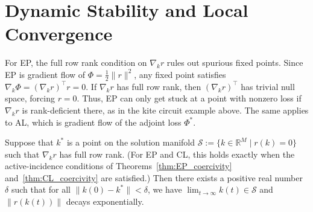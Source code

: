 \documentclass{siamart}
\begin{document}
\section{Dynamic Stability and Local Convergence}
\label{sec:convergence}

\begin{remark}
For EP, the full row rank condition on $\nabla_k r$ rules out spurious fixed points. Since EP is gradient flow of $\Phi = \frac{1}{2}\|r\|^2$, any fixed point satisfies $\nabla_k \Phi = (\nabla_k r)^\top r = 0$. If $\nabla_k r$ has full row rank, then $(\nabla_k r)^\top$ has trivial null space, forcing $r = 0$. Thus, EP can only get stuck at a point with nonzero loss if $\nabla_k r$ is rank-deficient there, as in the kite circuit example above. The same applies to AL, which is gradient flow of the adjoint loss $\Phi^*$.
\end{remark}

\begin{theorem}\label{thm:local_convergence}
Suppose that $k^*$ is a point on the solution manifold $\mathcal{S}:=\{k \in \mathbb{R}^M \mid r(k) = 0\}$ such that $\nabla_k r$ has full row rank. (For EP and CL, this holds exactly when the active-incidence conditions of Theorems~\ref{thm:EP_coercivity} and~\ref{thm:CL_coercivity} are satisfied.) Then there exists a positive real number $\delta$ such that for all $\|k(0) - k^*\| < \delta$, we have $\lim_{t \to \infty} k(t) \in \mathcal{S}$ and $\|r(k(t))\|$ decays exponentially.
\end{theorem}
\end{document}
